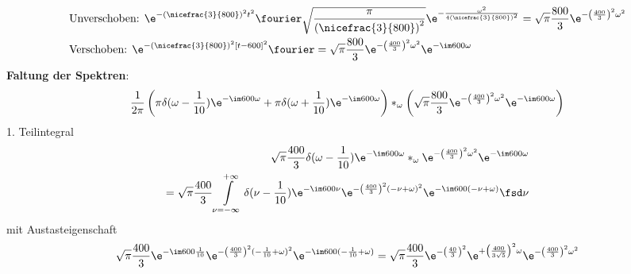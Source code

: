 \begin{ExCalc}
\begin{align}
&\text{Unverschoben: } \e^{-\left(\nicefrac{3}{800}\right)^2 t^2} \fourier \sqrt{\frac{\pi}{\left(\nicefrac{3}{800}\right)^2}}
\e^{-\frac{\omega^2}{4 \left(\nicefrac{3}{800}\right)^2}}
=\sqrt{\pi} \frac{800}{3} \e^{-\left(\frac{400}{3}\right)^2 \omega^2}\\
&\text{Verschoben: } \e^{-\left(\nicefrac{3}{800}\right)^2 [t-600]^2} \fourier
=\sqrt{\pi} \frac{800}{3} \e^{-\left(\frac{400}{3}\right)^2 \omega^2} \e^{-\im 600 \omega}
\end{align}
%
\noindent\textbf{Faltung der Spektren}:
\begin{align}
\frac{1}{2\pi} \left(\pi\delta(\omega - \frac{1}{10})\e^{-\im 600 \omega} + \pi\delta(\omega + \frac{1}{10})\e^{-\im 600 \omega}\right)
\ast_\omega
\left(\sqrt{\pi} \frac{800}{3} \e^{-\left(\frac{400}{3}\right)^2 \omega^2} \e^{-\im 600 \omega}\right)
\end{align}
1. Teilintegral
\begin{align}
\sqrt{\pi} \frac{400}{3}
\delta(\omega - \frac{1}{10})\e^{-\im 600 \omega}
\ast_\omega
\e^{-\left(\frac{400}{3}\right)^2 \omega^2} \e^{-\im 600 \omega}\nonumber\\
=\sqrt{\pi} \frac{400}{3} \int\limits_{\nu =-\infty}^{+\infty}
\delta(\nu - \frac{1}{10})\e^{-\im 600 \nu}
\e^{-\left(\frac{400}{3}\right)^2 (-\nu+\omega)^2} \e^{-\im 600 (-\nu+\omega)}\fsd \nu
\end{align}
mit Austasteigenschaft
\begin{align}
\sqrt{\pi} \frac{400}{3}
\e^{-\im 600 \frac{1}{10}}
\e^{-\left(\frac{400}{3}\right)^2 (-\frac{1}{10}+\omega)^2} \e^{-\im 600 (-\frac{1}{10}+\omega)}
=\sqrt{\pi} \frac{400}{3}
\e^{-\left(\frac{40}{3}\right)^2}
\e^{+\left(\frac{400}{3 \sqrt{5}}\right)^2 \omega}
\e^{-\left(\frac{400}{3}\right)^2 \omega^2}

\end{align}
\end{ExCalc}
